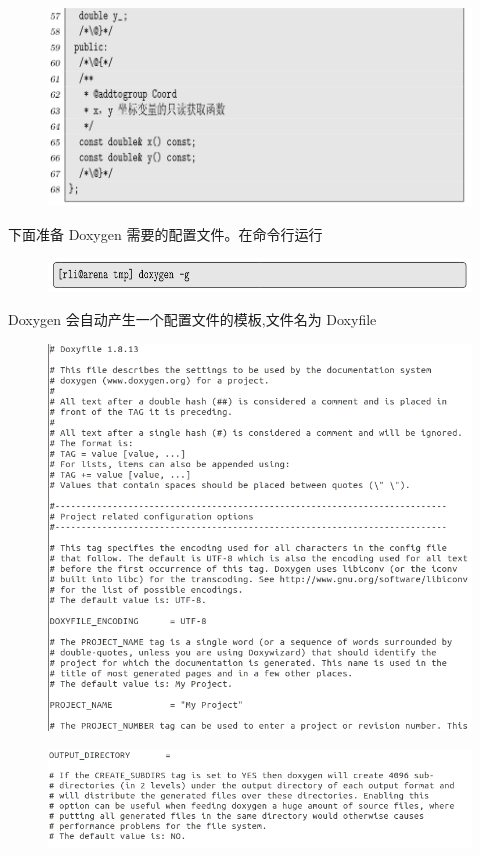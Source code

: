 \documentclass[12pt,a4paper]{article}
\begin{document}
\begin{figure}[H]
\centering
\includegraphics[scale=0.5]{./figures/17.png}
\caption{}
\end{figure}
下面准备 Doxygen 需要的配置文件。在命令行运行
\begin{figure}[H]
\centering
\includegraphics[scale=0.5]{./figures/18.png}
\caption{}
\end{figure}
Doxygen 会自动产生一个配置文件的模板,文件名为 Doxyfile 
\begin{figure}[H]
\centering
\includegraphics[scale=0.5]{./figures/33.png}
\caption{}
\end{figure}

\begin{figure}[H]
\centering
\includegraphics[scale=0.5]{./figures/34.png}
\caption{}
\end{figure}
\end{document}
